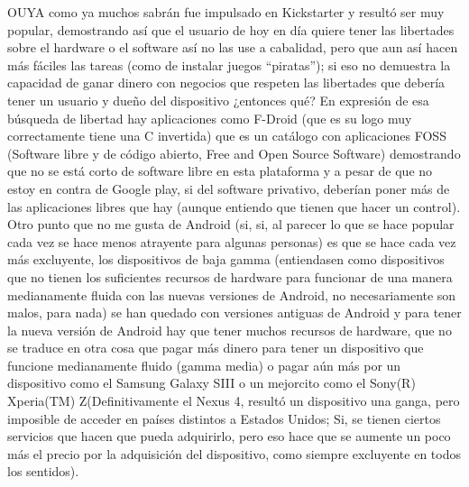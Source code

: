 \begin{multicols}{2}
OUYA como ya muchos sabrán fue impulsado en Kickstarter y resultó ser muy popular, demostrando así que el usuario de hoy en día quiere tener las libertades sobre el hardware o el software así no las use a cabalidad, pero que aun así hacen más fáciles las tareas (como de instalar juegos “piratas”); si eso no demuestra la capacidad de ganar dinero con negocios que respeten las libertades que debería tener un usuario y dueño del dispositivo ¿entonces qué?
En expresión de esa búsqueda de libertad hay aplicaciones como F-Droid (que es su logo muy correctamente tiene una C invertida) que es un catálogo con aplicaciones FOSS (Software libre y de código abierto, Free and Open Source Software) demostrando que no se está corto de software libre en esta plataforma y a pesar de que no estoy en contra de Google play, si del software privativo, deberían poner más de las aplicaciones libres que hay (aunque entiendo que tienen que hacer un control).
Otro punto que no me gusta de Android (si, si, al parecer lo que se hace popular cada vez se hace menos atrayente para algunas personas) es que se hace cada vez más excluyente, los dispositivos de baja gamma (entiendasen como dispositivos que no tienen los suficientes recursos de hardware para funcionar de una manera medianamente fluida con las nuevas versiones de Android, no necesariamente son malos, para nada) se han quedado con versiones antiguas de Android y para tener la nueva versión de Android hay que tener muchos recursos de hardware, que no se traduce en otra cosa que pagar más dinero para tener un dispositivo que funcione medianamente fluido (gamma media) o pagar aún más por un dispositivo como el Samsung Galaxy SIII o un mejorcito como el Sony(R) Xperia(TM) Z(Definitivamente el Nexus 4, resultó un dispositivo una ganga, pero imposible de acceder en países distintos a Estados Unidos; Si, se tienen ciertos servicios que hacen que pueda adquirirlo, pero eso hace que se aumente un poco más el precio por la adquisición del dispositivo, como siempre excluyente en todos los sentidos).

\end{multicols}
